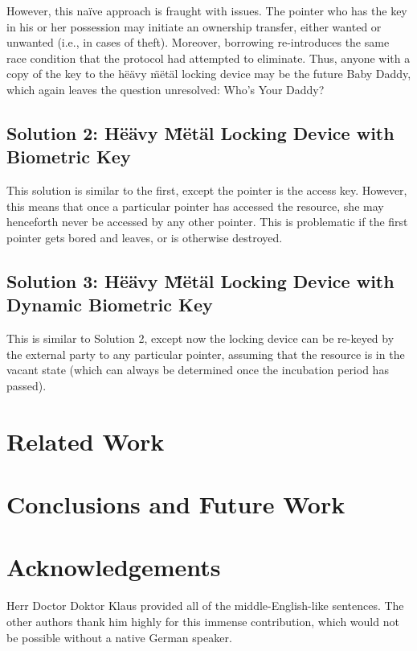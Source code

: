 \documentclass[10pt,twocolumn,letterpaper]{article}
\begin{document}
However, this na\"{i}ve approach is fraught with issues. The pointer who has the key in his or her possession may initiate an ownership transfer, either wanted or unwanted (i.e., in cases of theft). Moreover, borrowing re-introduces the same race condition that the protocol had attempted to eliminate. Thus, anyone with a copy of the key to the h\"{e}\"{a}vy \"{m}\"{e}t\"{a}l locking device may be the future Baby Daddy, which again leaves the question unresolved: Who's Your Daddy?

\subsection{Solution 2: H\"{e}\"{a}vy \"{M}\"{e}t\"{a}l Locking Device with Biometric Key}
This solution is similar to the first, except the pointer is the access key. However, this means that once a particular pointer has accessed the resource, she may henceforth never be accessed by any other pointer. This is problematic if the first pointer gets bored and leaves, or is otherwise destroyed.

\subsection{Solution 3: H\"{e}\"{a}vy \"{M}\"{e}t\"{a}l Locking Device with Dynamic Biometric Key}
This is similar to Solution 2, except now the locking device can be re-keyed by the external party to any particular pointer, assuming that the resource is in the vacant state (which can always be determined once the incubation period has passed).

\section{Related Work}

\section{Conclusions and Future Work}
\section{Acknowledgements}
Herr Doctor Doktor Klaus provided all of the middle-English-like sentences. The other authors thank him highly for this immense contribution, which would not be possible without a native German speaker.
\end{document}
